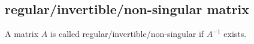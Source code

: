 \subsection{regular/invertible/non-singular matrix}

A matrix $A$ is called regular/invertible/non-singular if $A^{-1}$ exists.





